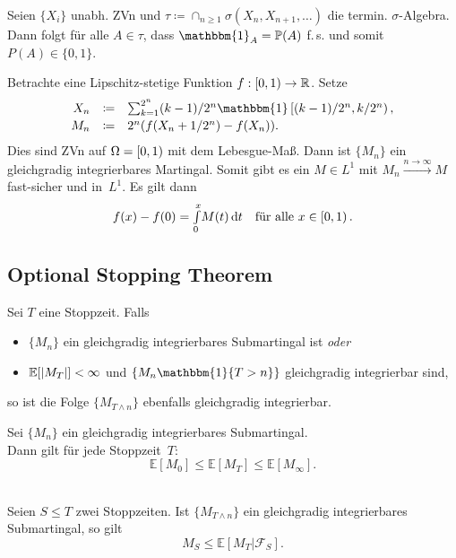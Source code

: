 \documentclass{cheat-sheet}
\renewcommand{\P}{\mathbb{P}} %
\newcommand{\E}{\mathbb{E}} %
\newcommand{\ind}{\mathbbm{1}} %
\newcommand{\Filt}{\mathcal{F}} %
\begin{document}
\begin{kor}
  Seien $\{ X_i \}$ unabh. ZVn und $\tau \coloneqq \cap_{n \geq 1} \sigma(X_n, X_{n+1}, \ldots)$ die termin. $\sigma$-Algebra.
  Dann folgt für alle $A \in \tau$, dass $\ind_A = \P(A)$ f.\,s. und somit $P(A) \in \{ 0, 1 \}$.
\end{kor}

\begin{bsp}
  Betrachte eine Lipschitz-stetige Funktion $f : \left[ 0, 1 \right) \to \mathbb{R}$.
  Setze
  \[
    \begin{array}{r c l}
      X_n &\coloneqq& {\sum}_{k=1}^{2^n} (k-1)/2^n \ind \cointerval{(k-1)/2^n}{k/2^n}, \\[0.2em]
      M_n &\coloneqq& 2^n (f(X_n + 1/2^n) - f(X_n)).
    \end{array}
  \]
  Dies sind ZVn auf $\Omega = \left[ 0, 1 \right)$ mit dem Lebesgue-Maß.
  Dann ist $\{ M_n \}$ ein gleichgradig integrierbares Martingal.
  Somit gibt es ein $M \in L^1$ mit $M_n \xrightarrow{n \to \infty} M$ fast-sicher und in~$L^1$.
  Es gilt dann
  \[
    f(x) - f(0) = {\textstyle \int\limits_{0}^{x}} M(t) \,\mathrm{d} t
    \quad \text{für alle } x \in \left[ 0, 1 \right).
  \]
\end{bsp}

\subsection{Optional Stopping Theorem}

\begin{satz}
  Sei $T$ eine Stoppzeit.
  Falls
  \begin{itemize}
    \item $\{ M_n \}$ ein gleichgradig integrierbares Submartingal ist \textit{oder}
    \item $\E[ \abs{M_T} ] < \infty$ und $\{ M_n \ind \{ T > n \} \}$ gleichgradig integrierbar sind,
  \end{itemize}
  so ist die Folge $\{ M_{T \wedge n} \}$ ebenfalls gleichgradig integrierbar.
\end{satz}

\begin{satz}
  Sei $\{ M_n \}$ ein gleichgradig integrierbares Submartingal. \\
  Dann gilt für jede Stoppzeit~$T$:
  \[ \E[M_0] \leq \E[M_T] \leq \E[M_\infty]. \]
\end{satz}

\begin{satz} \mbox{}\\
  Seien $S \leq T$ zwei Stoppzeiten.
  Ist $\{ M_{T \wedge n} \}$ ein gleichgradig integrierbares Submartingal, so gilt
  \[
    M_S \leq \E[ M_T | \Filt_S ].
  \]
\end{satz}
\end{document}
